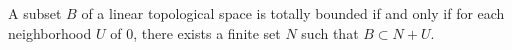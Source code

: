A subset $B$ of a linear topological space is totally bounded if and only if for each neighborhood $U$ of $0$, there exists a finite set $N$ such that $B \subset N + U$.
